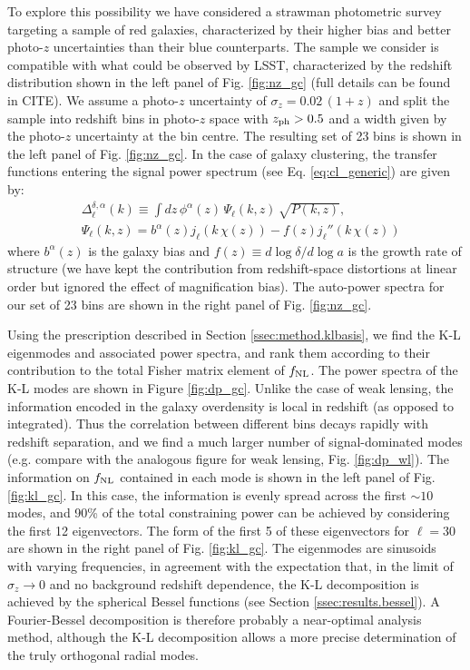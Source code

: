 \documentclass[twocolumn,amsfont,amssymb,amsmath, showpacs,balancelastpage, nofootinbib]{revtex4-1}
\begin{document}
    To explore this possibility we have considered a strawman photometric survey targeting a sample of red galaxies, characterized by their higher bias and better photo-$z$ uncertainties than their blue counterparts. The sample we consider is compatible with what could be observed by LSST, characterized by the redshift distribution shown in the left panel of Fig. \ref{fig:nz_gc} (full details can be found in CITE). We assume a photo-$z$ uncertainty of $\sigma_z=0.02\,(1+z)$ and split the sample into redshift bins in photo-$z$ space with $z_{\rm ph}>0.5$ and a width given by the photo-$z$ uncertainty at the bin centre. The resulting set of 23 bins is shown in the left panel of Fig. \ref{fig:nz_gc}. In the case of galaxy clustering, the transfer functions entering the signal power spectrum (see Eq. \ref{eq:cl_generic}) are given by:
    \begin{align}\nonumber
      &\Delta^{\delta,\alpha}_\ell(k)\equiv\int dz\,\phi^\alpha(z)\,\Psi_\ell(k,z)\,\sqrt{P(k,z)},\\\label{eq:tgc_dr}
      &\Psi_\ell(k,z)=b^\alpha(z)j_\ell(k\,\chi(z))-f(z)j_\ell''(k\,\chi(z))
    \end{align}
    where $b^\alpha(z)$ is the galaxy bias and $f(z)\equiv d\log\delta/d\log a$ is the growth rate of structure (we have kept the contribution from redshift-space distortions at linear order but ignored the effect of magnification bias). The auto-power spectra for our set of 23 bins are shown in the right panel of Fig. \ref{fig:nz_gc}.
    
    Using the prescription described in Section \ref{ssec:method.klbasis}, we find the K-L eigenmodes and associated power spectra, and rank them according to their contribution to the total Fisher matrix element of $f_{\rm NL}$. The power spectra of the K-L modes are shown in Figure \ref{fig:dp_gc}. Unlike the case of weak lensing, the information encoded in the galaxy overdensity is local in redshift (as opposed to integrated). Thus the correlation between different bins decays rapidly with redshift separation, and we find a much larger number of signal-dominated modes (e.g. compare with the analogous figure for weak lensing, Fig. \ref{fig:dp_wl}). The information on $f_{\rm NL}$ contained in each mode is shown in the left panel of Fig. \ref{fig:kl_gc}. In this case, the information is evenly spread across the first $\sim10$ modes, and 90\% of the total constraining power can be achieved by considering the first 12 eigenvectors. The form of the first 5 of these eigenvectors for $\ell=30$ are shown in the right panel of Fig. \ref{fig:kl_gc}. The eigenmodes are sinusoids with varying frequencies, in agreement with the expectation that, in the limit of $\sigma_z\rightarrow0$ and no background redshift dependence, the K-L decomposition is achieved by the spherical Bessel functions (see Section \ref{ssec:results.bessel}). A Fourier-Bessel decomposition is therefore probably a near-optimal analysis method, although the K-L decomposition allows a more precise determination of the truly orthogonal radial modes.
    
\end{document}
